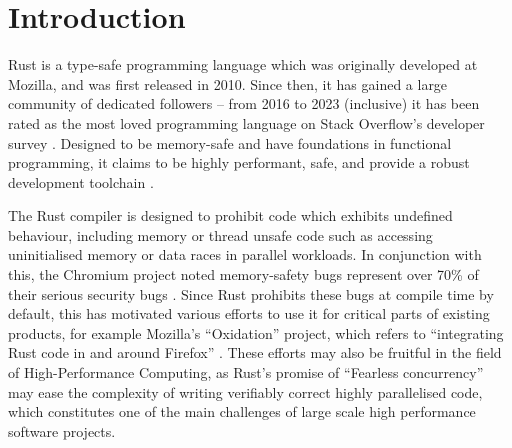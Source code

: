 \chapter{Introduction}
\label{ch:introduction} %


Rust is a type-safe programming language which was originally developed at Mozilla, and was first released in 2010. Since then, it has gained a large community of dedicated followers -- from 2016 to 2023 (inclusive) it has been rated as the most loved programming language on Stack Overflow's developer survey \cite{StackOverflowDeveloper}. Designed to be memory-safe and have foundations in functional programming, it claims to be highly performant, safe, and provide a robust development toolchain \cite{RustProgrammingLanguage}.

The Rust compiler is designed to prohibit code which exhibits undefined behaviour, including memory or thread unsafe code such as accessing uninitialised memory or data races in parallel workloads. 
In conjunction with this, the Chromium project noted memory-safety bugs represent over 70\% of their serious security bugs \cite{MemorySafety}. Since Rust prohibits these bugs at compile time by default, this has motivated various efforts to use it for critical parts of existing products, for example Mozilla's ``Oxidation'' project, which refers to ``integrating Rust code in and around Firefox'' \cite{OxidationMozillaWiki}. These efforts may also be fruitful in the field of High-Performance Computing, as Rust's promise of ``Fearless concurrency'' may ease the complexity of writing verifiably correct highly parallelised code, which constitutes one of the main challenges of large scale high performance software projects. %


